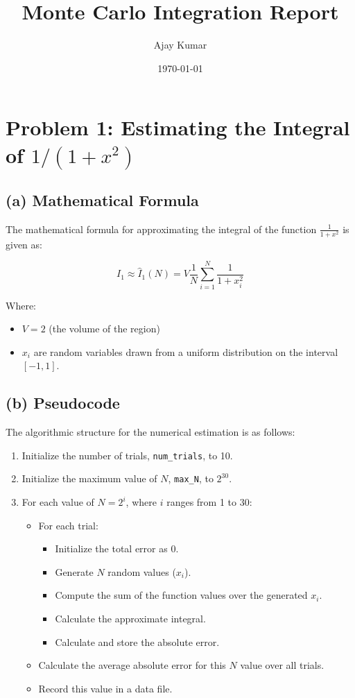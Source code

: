 \documentclass{article}
\title{Monte Carlo Integration Report}
\author{Ajay Kumar}
\date{\today}
\begin{document}
\maketitle

\section{Problem 1: Estimating the Integral of $1 / (1 + x^2)$}

\subsection{(a) Mathematical Formula}
The mathematical formula for approximating the integral of the function $\frac{1}{1 + x^2}$ is given as:

\[ I_1 \approx \hat{I}_1(N) = V \frac{1}{N} \sum_{i=1}^{N} \frac{1}{1 + x_i^2} \]

Where:
\begin{itemize}
\item $V = 2$ (the volume of the region)
\item $x_i$ are random variables drawn from a uniform distribution on the interval $[-1, 1]$.
\end{itemize}

\subsection{(b) Pseudocode}

The algorithmic structure for the numerical estimation is as follows:
\begin{enumerate}
\item Initialize the number of trials, \texttt{num\_trials}, to 10.
\item Initialize the maximum value of $N$, \texttt{max\_N}, to $2^{30}$.
\item For each value of $N = 2^i$, where $i$ ranges from 1 to 30:
   \begin{itemize}
   \item For each trial:
     \begin{itemize}
     \item Initialize the total error as 0.
     \item Generate $N$ random values ($x_i$).
     \item Compute the sum of the function values over the generated $x_i$.
     \item Calculate the approximate integral.
     \item Calculate and store the absolute error.
     \end{itemize}
   \item Calculate the average absolute error for this $N$ value over all trials.
   \item Record this value in a data file.
   \end{itemize}
\end{enumerate}
\end{document}
